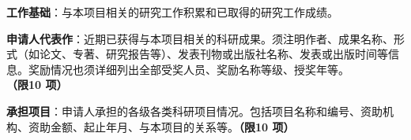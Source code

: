 \begin{HuazhongOutline}
  \item \textbf{工作基础}：与本项目相关的研究工作积累和已取得的研究工作成绩。
  \item \textbf{申请人代表作}：近期已获得与本项目相关的科研成果。须注明作者、成果名称、形式（如论文、专著、研究报告等）、发表刊物或出版社名称、发表或出版时间等信息。奖励情况也须详细列出全部受奖人员、奖励名称等级、授奖年等。\textbf{（限10 项）}
  \item \textbf{承担项目}：申请人承担的各级各类科研项目情况。包括项目名称和编号、资助机构、资助金额、起止年月、与本项目的关系等。\textbf{（限10 项）}
\end{HuazhongOutline}
